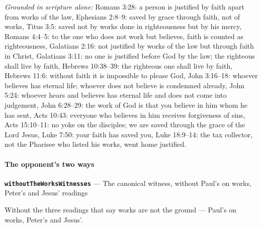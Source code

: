 \documentclass[11pt,paper=\testimonypaper,DIV=13,parskip=false]{scrartcl}
\begin{document}
\emph{Grounded in scripture alone:} Romans 3:28: a person is justified by faith apart from works of the law, Ephesians 2:8–9: saved by grace through faith, not of works, Titus 3:5: saved not by works done in righteousness but by his mercy, Romans 4:4–5: to the one who does not work but believes, faith is counted as righteousness, Galatians 2:16: not justified by works of the law but through faith in Christ, Galatians 3:11: no one is justified before God by the law; the righteous shall live by faith, Hebrews 10:38–39: the righteous one shall live by faith, Hebrews 11:6: without faith it is impossible to please God, John 3:16–18: whoever believes has eternal life; whoever does not believe is condemned already, John 5:24: whoever hears and believes has eternal life and does not come into judgement, John 6:28–29: the work of God is that you believe in him whom he has sent, Acts 10:43: everyone who believes in him receives forgiveness of sins, Acts 15:10–11: no yoke on the disciples; we are saved through the grace of the Lord Jesus, Luke 7:50: your faith has saved you, Luke 18:9–14: the tax collector, not the Pharisee who listed his works, went home justified.
\paragraph*{The opponent’s two ways}
\leavevmode\par\nobreak
\par\medskip\noindent\textbf{\texttt{without\allowbreak{}The\allowbreak{}Works\allowbreak{}Witnesses}} --- The canonical witness, without Paul’s on works, Peter’s and Jesus’ readings\par\nobreak\noindent
Without the three readings that say works are not the ground — Paul’s on works, Peter’s and Jesus’.
\end{document}
